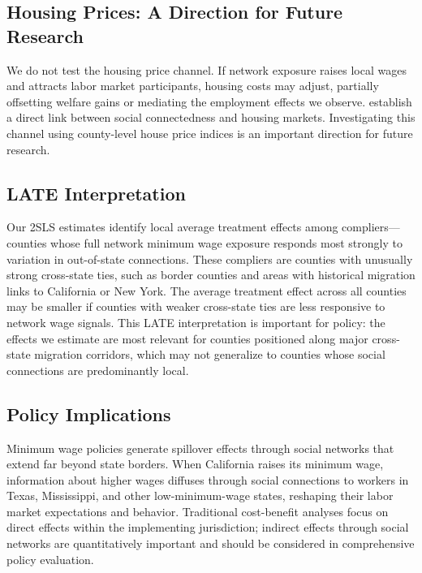 \documentclass[12pt]{article}
\begin{document}
\subsection{Housing Prices: A Direction for Future Research}

We do not test the housing price channel. If network exposure raises local wages and attracts labor market participants, housing costs may adjust, partially offsetting welfare gains \citep{roback1982wages} or mediating the employment effects we observe. \citet{bailey2018house} establish a direct link between social connectedness and housing markets. Investigating this channel using county-level house price indices is an important direction for future research.

\subsection{LATE Interpretation}

Our 2SLS estimates identify local average treatment effects among compliers---counties whose full network minimum wage exposure responds most strongly to variation in out-of-state connections. These compliers are counties with unusually strong cross-state ties, such as border counties and areas with historical migration links to California or New York. The average treatment effect across all counties may be smaller if counties with weaker cross-state ties are less responsive to network wage signals. This LATE interpretation is important for policy: the effects we estimate are most relevant for counties positioned along major cross-state migration corridors, which may not generalize to counties whose social connections are predominantly local.

\subsection{Policy Implications}

Minimum wage policies generate spillover effects through social networks that extend far beyond state borders. When California raises its minimum wage, information about higher wages diffuses through social connections to workers in Texas, Mississippi, and other low-minimum-wage states, reshaping their labor market expectations and behavior. Traditional cost-benefit analyses focus on direct effects within the implementing jurisdiction; indirect effects through social networks are quantitatively important and should be considered in comprehensive policy evaluation.
\end{document}
